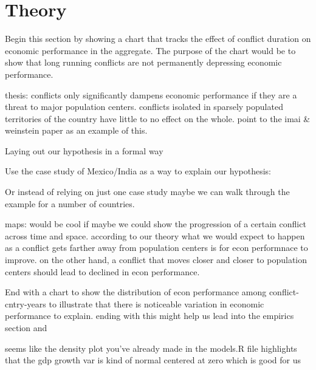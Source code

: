 \section{Theory}
\label{theory}

Begin this section by showing a chart that tracks the effect of conflict duration on economic performance in the aggregate. The purpose of the chart would be to show that long running conflicts are not permanently depressing economic performance. 

thesis: conflicts only significantly dampens economic performance if they are a threat to major population centers. conflicts isolated in sparsely populated territories of the country have little to no effect on the whole. point to the imai & weinstein paper as an example of this. 

Laying out our hypothesis in a formal way

	Use the case study of Mexico/India as a way to explain our hypothesis: 

	Or instead of relying on just one case study maybe we can walk through the example for a number of countries.

	maps: would be cool if maybe we could show the progression of a certain conflict across time and space. according to our theory what we would expect to happen as a conflict gets farther away from population centers is for econ performnace to improve. on the other hand, a conflict that moves closer and closer to population centers should lead to declined in econ performance.

End with a chart to show the distribution of econ performance among conflict-cntry-years to illustrate that there is noticeable variation in economic performance to explain. ending with this might help us lead into the empirics section and 

	seems like the density plot you've already made in the models.R file highlights that the gdp growth var is kind of normal centered at zero which is good for us	